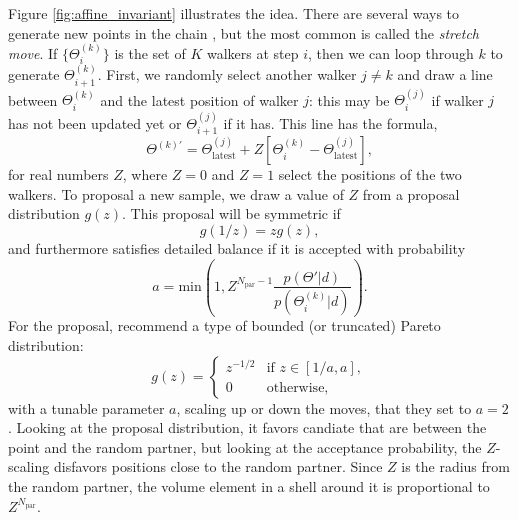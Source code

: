 Figure \ref{fig:affine_invariant} illustrates the idea.  There are several ways to generate new points in the chain \citep{2010CAMCS...5...65G}, but the most common is called the \textit{stretch move}.  If $\{ \Theta^{(k)}_{i} \}$ is the set of $K$ walkers at step $i$, then we can loop through $k$ to generate  $\Theta^{(k)}_{i+1}$.  First, we randomly select another walker $j \neq k$ and draw a line between $\Theta^{(k)}_{i}$ and the latest position of walker $j$: this may be $\Theta^{(j)}_{i}$ if walker $j$ has not been updated yet or $\Theta^{(j)}_{i+1}$ if it has.  This line has the formula,
\begin{equation}
  \Theta^{(k)\prime} =  \Theta^{(j)}_\mathrm{latest} + Z [  \Theta^{(k)}_{i}  -  \Theta^{(j)}_\mathrm{latest} ],
\end{equation}
for real numbers $Z$, where $Z=0$ and $Z=1$ select the positions of the two walkers.  To proposal a new sample, we draw a value of $Z$ from a proposal distribution $g(z)$.  This proposal will be symmetric if
\begin{equation}
  g(1/z) = z g(z),
\end{equation}
and furthermore satisfies detailed balance if it is accepted with probability
\begin{equation}
  a = \mathrm{min}\left( 1,Z^{N_\mathrm{par} - 1} \frac{p(\Theta'|d)}{p(\Theta^{(k)}_i|d)}          \right).
\end{equation}
For the proposal, \citet{2010CAMCS...5...65G} recommend a type of bounded (or truncated) Pareto distribution:
\begin{equation}
  g(z) = \left\{
    \begin{array}{ll}
      z^{-1/2} &\mbox{if }z\in [1/a,a], \\
      0 &\mbox{otherwise},
    \end{array}       \right.
\end{equation}
with a tunable parameter $a$, scaling up or down the moves, that they set to $a=2$.  Looking at the proposal distribution, it favors candiate that are between the point and the random partner, but looking at the acceptance probability, the $Z$-scaling disfavors positions close to the random partner.  Since $Z$ is the radius from the random partner, the volume element in a shell around it is proportional to $Z^{N_\textrm{par}}$.

